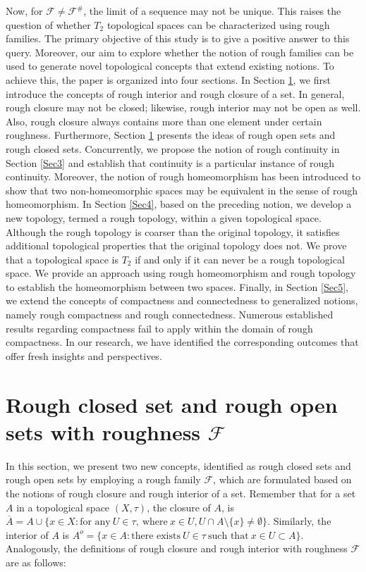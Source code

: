 \documentclass[11pt]{amsart}
\begin{document}
   
    Now, for $\mathscr{F}\neq \mathscr{F^\#}$, the limit of a sequence may not be unique. This raises the question of whether $T_2$ topological spaces can be characterized using rough families. The primary objective of this study is to give a positive answer to this query. Moreover, our aim to explore whether the notion of rough families can be used to generate novel topological concepts that extend existing notions. To achieve this, the paper is organized into four sections. In Section \ref{Sec1}, we first introduce the concepts of rough interior and rough closure of a set. In general, rough closure may not be closed; likewise, rough interior may not be open as well. Also, rough closure always contains more than one element under certain roughness. Furthermore, Section \ref{Sec1} presents the ideas of rough open sets and rough closed sets. 
    Concurrently, we propose the notion of rough continuity in Section \ref{Sec3} and establish that continuity is a particular instance of rough continuity. Moreover, the notion of rough homeomorphism has been introduced to show that two non-homeomorphic spaces may be equivalent in the sense of rough homeomorphism. In Section \ref{Sec4}, based on the preceding notion, we develop a new topology, termed a rough topology, within a given topological space. Although the rough topology is coarser than the original topology, it satisfies additional topological properties that the original topology does not. We prove that a topological space is $T_2$ if and only if it can never be a rough topological space. We provide an approach using rough homeomorphism and rough topology to establish the homeomorphism between two spaces. Finally, in Section \ref{Sec5}, we extend the concepts of compactness and connectedness to generalized notions, namely rough compactness and rough connectedness. Numerous established results regarding compactness fail to apply within the domain of rough compactness. In our research, we have identified the corresponding outcomes that offer fresh insights and perspectives.




\section{Rough closed set and rough open sets with roughness $\mathscr{F}$}\label{Sec1}

In this section, we present two new concepts, identified as rough closed sets and rough open sets by employing a rough family \(\mathscr{F}\), which are formulated based on the notions of rough closure and rough interior of a set. Remember that for a set $A$ in a topological space $(X,\tau)$, the closure of \( A \), is \( \overline{A}=A\cup \{x \in X : \text{for any}~U \in \tau,~\text{where}~x \in U, U \cap A \setminus \{x\} \neq \emptyset\}\). Similarly, the interior of \( A \) is \( A^o =\{x \in A : \text{there exists}~U \in \tau~\text{such that}~x \in U \subset A\}\). Analogously, the definitions of rough closure and rough interior with roughness $\mathscr{F}$ are as follows:
\end{document}

